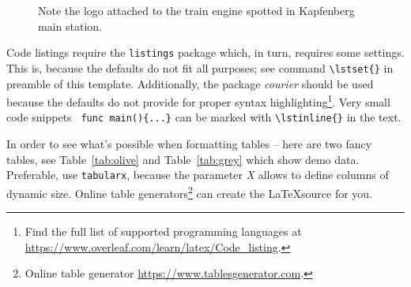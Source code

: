 \begin{figure}[tp]
  \centering
  \caption[Logo at the Train Engine]
          {Note the logo attached to the train
           engine spotted in Kapfenberg main station.}
  \label{fig:engine}
\end{figure}

Code listings require the \verb+listings+ package which, in turn,
requires some settings. This is, because the defaults do not fit all
purposes; see command \verb+\lstset{}+ in preamble of this template.
Additionally, the package \textit{courier} should be used because the
defaults do not provide for proper syntax highlighting\footnote{
Find the full list of supported programming languages at
\url{https://www.overleaf.com/learn/latex/Code_listing}.
}. Very small code snippets \lstinline$ func main(){...}$ can be marked with \verb+\lstinline{}+ in the text.



In order to see what's possible when formatting tables -- here are two fancy
tables, see Table~\ref{tab:olive} and Table~\ref{tab:grey} which show
demo data. Preferable, use  \verb+tabularx+, because the parameter \emph{X}
allows to define columns of dynamic size. Online table generators\footnote{Online table generator \url{https://www.tablesgenerator.com}.} can create the \LaTeX source for you.

